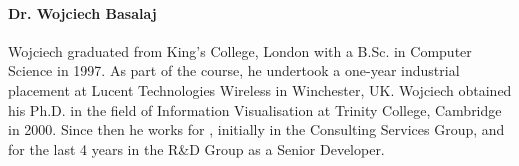 \documentclass[a4paper,11pt]{article}
\begin{document}

\paragraph{Dr. Wojciech Basalaj}
Wojciech graduated from King's College, London with a B.Sc. in Computer Science in 1997. As part of the course, he undertook a one-year industrial placement at Lucent Technologies Wireless in Winchester, UK. Wojciech obtained his Ph.D. in the field of Information Visualisation at Trinity College, Cambridge in 2000. Since then he works for \PRshort{}, initially in the Consulting Services Group, and for the last 4 years in the R\&D Group as a Senior Developer.
\end{document}

